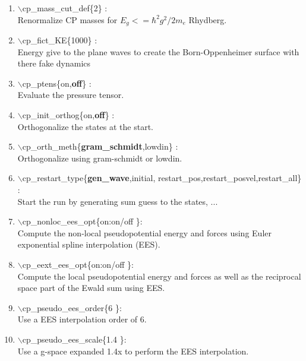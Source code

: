 \documentclass[12pt,titlepage]{article}
\begin{document}
\begin{enumerate}
 \vspace{0.15in} 
 \item  $\backslash$cp\_mass\_cut\_def\{2\} : \\
      Renormalize CP masses for $E_g<=\hbar^2g^2/2m_e$ Rhydberg.

 \vspace{0.15in} 
 \item  $\backslash$cp\_fict\_KE\{1000\} : \\
      Energy give to the plane waves to create the Born-Oppenheimer
      surface with there fake dynamics

 \vspace{0.15in} 
 \item  $\backslash$cp\_ptens\{on,{\bf off}\} : \\
      Evaluate the pressure tensor. 

 \vspace{0.15in} 
 \item  $\backslash$cp\_init\_orthog\{on,{\bf off}\} : \\
      Orthogonalize the states at the start.

 \vspace{0.15in} 
 \item  $\backslash$cp\_orth\_meth\{{\bf gram\_schmidt},lowdin\} : \\
      Orthogonalize using gram-schmidt or lowdin.

 \vspace{0.15in} 
 \item  $\backslash$cp\_restart\_type\{{\bf gen\_wave},initial,
                         restart\_pos,restart\_posvel,restart\_all\} : \\
      Start the run by generating sum guess to the states, ...

 \vspace{0.15in} 
 \item  $\backslash$cp\_nonloc\_ees\_opt\{on:on/off \}: \\     
 Compute the non-local pseudopotential energy and forces using Euler
 exponential spline interpolation (EES).

 \vspace{0.15in} 
 \item  $\backslash$cp\_eext\_ees\_opt\{on:on/off \}: \\     
     Compute the local pseudopotential energy and forces as well as the 
     reciprocal space part of the Ewald sum using  EES.

 \vspace{0.15in} 
 \item  $\backslash$cp\_pseudo\_ees\_order\{6 \}: \\     
     Use a EES interpolation order of 6.

 \vspace{0.15in} 
 \item  $\backslash$cp\_pseudo\_ees\_scale\{1.4 \}: \\     
     Use a g-space expanded 1.4x to perform the EES interpolation.
\end{enumerate}
\end{document}
